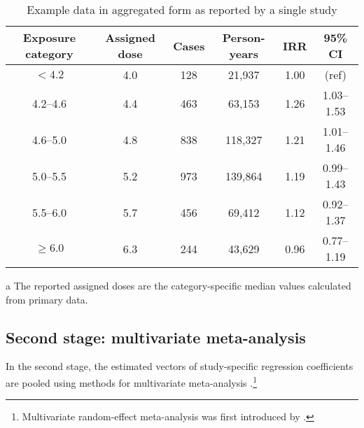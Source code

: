 \begin{table}[ht]
\centering
\begin{adjustbox}{max width=\textwidth}
\begin{threeparttable}
\caption{Example data in aggregated form as reported by a single study}
\label{table:examplecorr}
\begin{tabular}{cccccc}
\hline
{\bf Exposure category} & {\bf Assigned dose}\tnote{a} & {\bf Cases} & {\bf Person-years} & {\bf IRR}  & {\bf 95\% CI} \\ \hline
$<4.2$                  & 4.0                 & 128         & 21,937             & 1.00		  & (ref)           \\
4.2--4.6                & 4.4                 & 463         & 63,153             & 1.26       & 1.03--1.53    \\
4.6--5.0                & 4.8                 & 838         & 118,327            & 1.21       & 1.01--1.46    \\
5.0--5.5                & 5.2                 & 973         & 139,864            & 1.19       & 0.99--1.43    \\
5.5--6.0                & 5.7                 & 456         & 69,412             & 1.12       & 0.92--1.37    \\
$\ge 6.0$               & 6.3                 & 244         & 43,629             & 0.96       & 0.77--1.19    \\ \hline
\end{tabular}
\begin{tablenotes}
\item [a] \footnotesize The reported assigned doses are the category-specific median values calculated from primary data. 
\end{tablenotes}
\end{threeparttable}
\end{adjustbox}
\end{table}


\subsection{Second stage: multivariate meta-analysis}

In the second stage, the estimated  vectors of study-specific regression coefficients are pooled using methods for multivariate meta-analysis \citep{berkey_metaanalysis_1998, vanhouwelingen_advanced_2002, jackson_extending_2010, jackson_multivariate_2011, gasparrini_multivariate_2012}.\footnote{Multivariate random-effect meta-analysis was first introduced by \citet*{vanhouwelingen_bivariate_1993}.}

